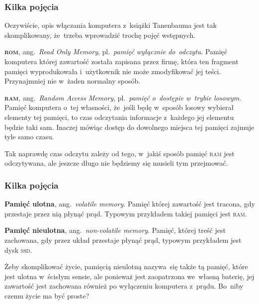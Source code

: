 \documentclass[10pt,t]{beamer}
\begin{document}
\begin{frame}
  \frametitle{Kilka pojęcia}


  Oczywiście, opis włączania komputera z~książki Tanenbauma jest tak
  skomplikowany, że~trzeba wprowadzić trochę pojęć wstępnych.

  \textbf{\textsc{rom}}, ang.~\textit{Read Only Memory}, pl.~\textit{pamięć
    wyłącznie do~odczytu}. Pamięć komputera której zawartość została
  zapisana przez firmę, która ten fragment pamięci wyprodukowała
  i~użytkownik nie może zmodyfikować jej teści. Przynajmniej nie w~żaden
  normalny sposób.

  \textbf{\textsc{ram}}, ang.~\textit{Random Access Memory},
  pl.~\textit{pamięć o~dostępie w~trybie losowym}. Pamięć komputera o~tej
  własności, że~jeśli będę w~sposób losowy wybierał elementy tej pamięci,
  to czas odczytania informacje z~każdego jej elementu będzie taki sam.
  Inaczej mówiąc dostęp do dowolnego miejsca tej pamięci zajmuje tyle samo
  czasu.

  Tak naprawdę czas odczytu zależy od tego, w~jakiś sposób pamięć
  \textsc{ram} jest odczytywana, ale jeszcze długo nie będziemy się musieli
  tym przejmować.

\end{frame}





\begin{frame}
  \frametitle{Kilka pojęcia}


  \textbf{Pamięć ulotna}, ang.~\textit{volatile memory}. Pamięć której
  zawartość jest tracona, gdy przestaje przez nią płynąć prąd. Typowym
  przykładem takiej pamięci jest \textsc{ram}.

  \textbf{Pamięć nieulotna}, ang.~\textit{non-volatile memory}. Pamięć,
  której treść jest zachowana, gdy przez układ przestaje płynąć prąd,
  typowym przykładem jest dysk \textsc{ssd}.

  Żeby skomplikować życie, pamięcią nieulotną nazywa~się także tą pamięć,
  które jest ulotna w~ścisłym sensie, ale ponieważ jest zaopatrzona
  we~własną baterię, jej zawartość jest zachowana również po wyłączeniu
  komputera z~prądu. Bo~niby czemu życie ma być proste?

\end{frame}
\end{document}
